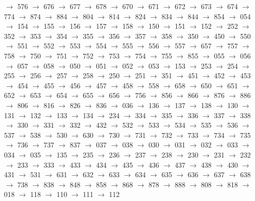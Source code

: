 $\rightarrow$ 576 $\rightarrow$ 676 $\rightarrow$ 677 $\rightarrow$ 678 $\rightarrow$ 670 $\rightarrow$ 671 $\rightarrow$ 672 $\rightarrow$ 673 $\rightarrow$ 674 $\rightarrow$ 774 $\rightarrow$ 874 $\rightarrow$ 884 $\rightarrow$ 804 $\rightarrow$ 814 $\rightarrow$ 824 $\rightarrow$ 834 $\rightarrow$ 844 $\rightarrow$ 854 $\rightarrow$ 054 $\rightarrow$ 154 $\rightarrow$ 155 $\rightarrow$ 156 $\rightarrow$ 157 $\rightarrow$ 158 $\rightarrow$ 150 $\rightarrow$ 151 $\rightarrow$ 152 $\rightarrow$ 252 $\rightarrow$ 352 $\rightarrow$ 353 $\rightarrow$ 354 $\rightarrow$ 355 $\rightarrow$ 356 $\rightarrow$ 357 $\rightarrow$ 358 $\rightarrow$ 350 $\rightarrow$ 450 $\rightarrow$ 550 $\rightarrow$ 551 $\rightarrow$ 552 $\rightarrow$ 553 $\rightarrow$ 554 $\rightarrow$ 555 $\rightarrow$ 556 $\rightarrow$ 557 $\rightarrow$ 657 $\rightarrow$ 757 $\rightarrow$ 758 $\rightarrow$ 750 $\rightarrow$ 751 $\rightarrow$ 752 $\rightarrow$ 753 $\rightarrow$ 754 $\rightarrow$ 755 $\rightarrow$ 855 $\rightarrow$ 055 $\rightarrow$ 056 $\rightarrow$ 057 $\rightarrow$ 058 $\rightarrow$ 050 $\rightarrow$ 051 $\rightarrow$ 052 $\rightarrow$ 053 $\rightarrow$ 153 $\rightarrow$ 253 $\rightarrow$ 254 $\rightarrow$ 255 $\rightarrow$ 256 $\rightarrow$ 257 $\rightarrow$ 258 $\rightarrow$ 250 $\rightarrow$ 251 $\rightarrow$ 351 $\rightarrow$ 451 $\rightarrow$ 452 $\rightarrow$ 453 $\rightarrow$ 454 $\rightarrow$ 455 $\rightarrow$ 456 $\rightarrow$ 457 $\rightarrow$ 458 $\rightarrow$ 558 $\rightarrow$ 658 $\rightarrow$ 650 $\rightarrow$ 651 $\rightarrow$ 652 $\rightarrow$ 653 $\rightarrow$ 654 $\rightarrow$ 655 $\rightarrow$ 656 $\rightarrow$ 756 $\rightarrow$ 856 $\rightarrow$ 866 $\rightarrow$ 876 $\rightarrow$ 886 $\rightarrow$ 806 $\rightarrow$ 816 $\rightarrow$ 826 $\rightarrow$ 836 $\rightarrow$ 036 $\rightarrow$ 136 $\rightarrow$ 137 $\rightarrow$ 138 $\rightarrow$ 130 $\rightarrow$ 131 $\rightarrow$ 132 $\rightarrow$ 133 $\rightarrow$ 134 $\rightarrow$ 234 $\rightarrow$ 334 $\rightarrow$ 335 $\rightarrow$ 336 $\rightarrow$ 337 $\rightarrow$ 338 $\rightarrow$ 330 $\rightarrow$ 331 $\rightarrow$ 332 $\rightarrow$ 432 $\rightarrow$ 532 $\rightarrow$ 533 $\rightarrow$ 534 $\rightarrow$ 535 $\rightarrow$ 536 $\rightarrow$ 537 $\rightarrow$ 538 $\rightarrow$ 530 $\rightarrow$ 630 $\rightarrow$ 730 $\rightarrow$ 731 $\rightarrow$ 732 $\rightarrow$ 733 $\rightarrow$ 734 $\rightarrow$ 735 $\rightarrow$ 736 $\rightarrow$ 737 $\rightarrow$ 837 $\rightarrow$ 037 $\rightarrow$ 038 $\rightarrow$ 030 $\rightarrow$ 031 $\rightarrow$ 032 $\rightarrow$ 033 $\rightarrow$ 034 $\rightarrow$ 035 $\rightarrow$ 135 $\rightarrow$ 235 $\rightarrow$ 236 $\rightarrow$ 237 $\rightarrow$ 238 $\rightarrow$ 230 $\rightarrow$ 231 $\rightarrow$ 232 $\rightarrow$ 233 $\rightarrow$ 333 $\rightarrow$ 433 $\rightarrow$ 434 $\rightarrow$ 435 $\rightarrow$ 436 $\rightarrow$ 437 $\rightarrow$ 438 $\rightarrow$ 430 $\rightarrow$ 431 $\rightarrow$ 531 $\rightarrow$ 631 $\rightarrow$ 632 $\rightarrow$ 633 $\rightarrow$ 634 $\rightarrow$ 635 $\rightarrow$ 636 $\rightarrow$ 637 $\rightarrow$ 638 $\rightarrow$ 738 $\rightarrow$ 838 $\rightarrow$ 848 $\rightarrow$ 858 $\rightarrow$ 868 $\rightarrow$ 878 $\rightarrow$ 888 $\rightarrow$ 808 $\rightarrow$ 818 $\rightarrow$ 018 $\rightarrow$ 118 $\rightarrow$ 110 $\rightarrow$ 111 $\rightarrow$ 112 